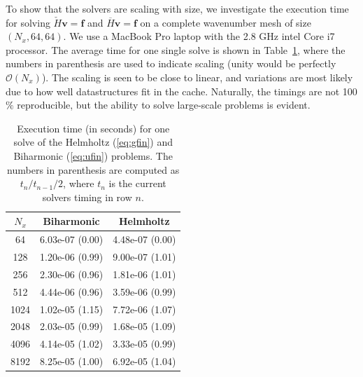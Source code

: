 \documentclass[11pt, oneside]{elsarticle}
\newcommand{\N}[1]{\check{#1}}
\newcommand{\D}[1]{\overline{#1}}
\begin{document}
To show that the solvers are scaling with size, we investigate the execution time 
for solving $\N{H} \bm{v} = \bm{f}$ and $\D{H} \bm{v} = \bm{f}$ on a complete 
wavenumber mesh of size $(N_x,64,64)$. We use a MacBook Pro laptop with the 2.8 GHz intel Core i7 processor. The average time for one single solve is shown in Table~\ref{tab:timings}, where the numbers in parenthesis are used to indicate scaling (unity would be perfectly $\mathcal{O}(N_x)$). The scaling is seen to be close to linear, and variations 
are most likely due to how well datastructures fit in the cache. Naturally, the timings are not 100$\%$ reproducible, but the ability to solve large-scale problems is evident.
\begin{table}
	\centering
	\caption{Execution time (in seconds) for one solve  of the Helmholtz 
	(\ref{eq:gfin}) and Biharmonic 
	(\ref{eq:ufin}) problems. The numbers in parenthesis are computed as $t_n / t_{n-1} / 2$, where $t_n$ is the current solvers timing in row $n$. 	\label{tab:timings}}
	\begin{tabular}{ccc}
$N_x$ & Biharmonic & Helmholtz \\ 
\hline
64 & 6.03e-07 (0.00) & 4.48e-07 (0.00) \\ 
128 & 1.20e-06 (0.99) & 9.00e-07 (1.01) \\ 
256 & 2.30e-06 (0.96) & 1.81e-06 (1.01) \\ 
512 & 4.44e-06 (0.96) & 3.59e-06 (0.99) \\ 
1024 & 1.02e-05 (1.15) & 7.72e-06 (1.07) \\ 
2048 & 2.03e-05 (0.99) & 1.68e-05 (1.09) \\ 
4096 & 4.14e-05 (1.02) & 3.33e-05 (0.99) \\ 
8192 & 8.25e-05 (1.00) & 6.92e-05 (1.04)
	\end{tabular}
\end{table}
\end{document}
